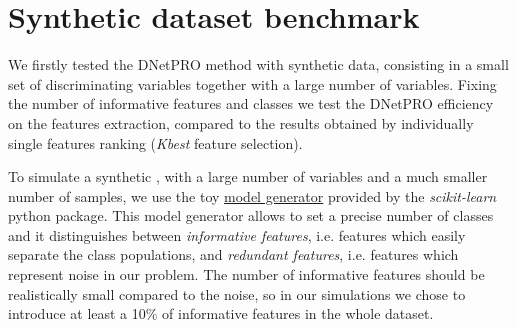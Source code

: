 \documentclass{standalone}
\begin{document}
\section[Toy Model]{Synthetic dataset benchmark}\label{toy}

We firstly tested the DNetPRO method with synthetic data, consisting in a small set of discriminating variables together with a large number of  variables.
Fixing the number of informative features and classes we test the DNetPRO efficiency on the features extraction, compared to the results obtained by individually single features ranking (\emph{Kbest} feature selection).

To simulate a synthetic , with a large number of variables and a much smaller number of samples, we use the toy \href{https://scikit-learn.org/stable/modules/generated/sklearn.datasets.make_classification.html}{model generator} provided by the \emph{scikit-learn}~\cite{scikit-learn} python package.
This model generator allows to set a precise number of classes and it distinguishes between \emph{informative features}, i.e. features which easily separate the class populations, and \emph{redundant features}, i.e. features which represent noise in our problem.
The number of informative features should be realistically small compared to the noise, so in our simulations we chose to introduce at least a 10\% of informative features in the whole dataset.


\end{document}
